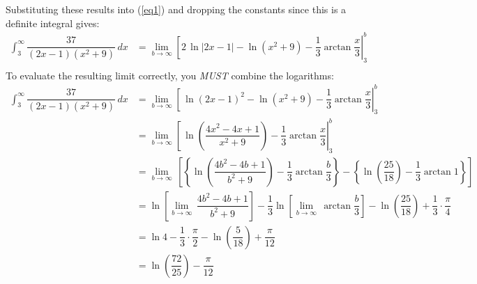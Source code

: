 \documentclass[noinstructornotes]{ximera}
\begin{document}
\begin{problem}
\begin{freeResponse}
Substituting these results into (\ref{eq1}) and dropping the constants since this is a definite integral  gives:
\begin{align*}
\displaystyle \int_3^{\infty} \dfrac{37}{(2x-1)(x^2+9)} \, dx &= \lim_{b \rightarrow \infty} \left[2 \, \ln |2x-1|-\ln (x^2+9) -\dfrac{1}{3} \arctan \dfrac{x}{3} \right|_3^b\\
\end{align*}
 To evaluate the resulting limit correctly, you \emph{MUST} combine the logarithms:
 \begin{align*}
\displaystyle \int_3^{\infty} \dfrac{37}{(2x-1)(x^2+9)} \, dx &= \lim_{b \rightarrow \infty} \left[ \, \ln (2x-1)^2-\ln (x^2+9) -\dfrac{1}{3} \arctan \dfrac{x}{3} \right|_3^b\\
 &= \lim_{b \rightarrow \infty} \left[ \, \ln \left( \dfrac{4x^2-4x+1}{x^2+9}\right) -\dfrac{1}{3} \arctan \dfrac{x}{3} \right|_3^b\\
  &= \lim_{b \rightarrow \infty} \, \left[ \left\{ \ln \left( \dfrac{4b^2-4b+1}{b^2+9} \right)-\dfrac{1}{3} \arctan \dfrac{b}{3} \right\} -\left\{\ln \left( \dfrac{25}{18} \right) -\dfrac{1}{3} \arctan 1 \right\} \right]\\
  &=  \ln \left[\lim_{b \rightarrow \infty} \, \dfrac{4b^2-4b+1}{b^2+9} \right]-\dfrac{1}{3}  \ln \left[\lim_{b \rightarrow \infty} \, \arctan \dfrac{b}{3} \right]- \ln \left( \dfrac{25}{18}\right) +\dfrac{1}{3}  \cdot \dfrac{\pi}{4} \\
  &=  \ln 4-\dfrac{1}{3} \cdot \dfrac{\pi}{2} - \ln \left( \dfrac{5}{18} \right) +\dfrac{\pi}{12} \\
    &= \boxed{\ln \left( \dfrac{72}{25} \right)-\dfrac{\pi}{12} }\\
\end{align*}

\end{freeResponse}
\end{problem}























	
	
	
	
	
	
	
	
\end{document}
